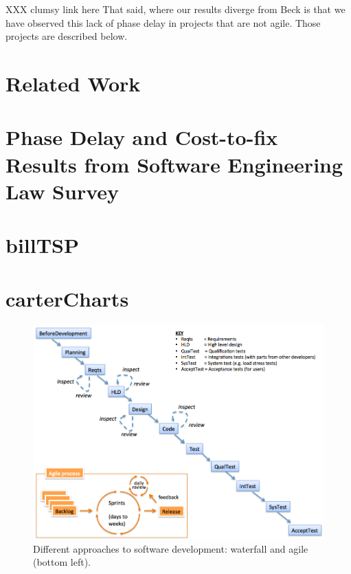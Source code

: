 \documentclass{sig-alternate}
\begin{document}
XXX clumsy link here
That said, where our results
diverge from Beck is that we have observed this lack of phase delay in  projects that are not agile. Those
projects are described below.

\section{Related Work}
 



\section{Phase Delay and Cost-to-fix Results from Software Engineering Law Survey}




\section{billTSP}

\section{carterCharts}




 
\begin{figure}[!t]
\begin{center}
\includegraphics[width=6in]{waterfall2.png}
\end{center}
\caption{Different approaches to software development:  waterfall and agile (bottom left).}
\end{figure}
\end{document}
